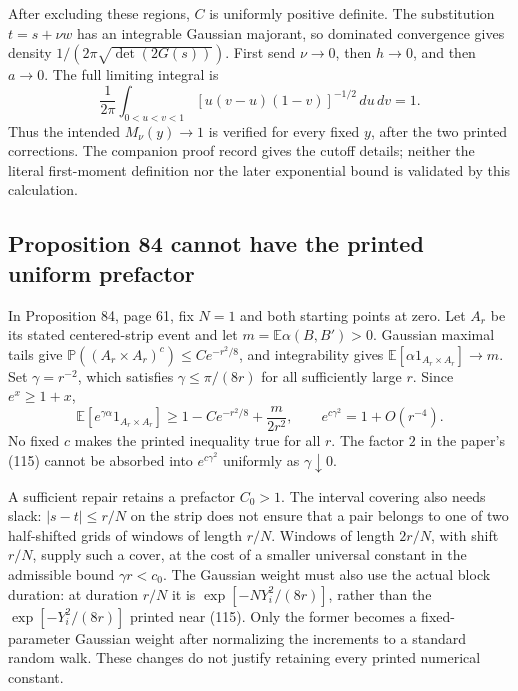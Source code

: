\documentclass[10pt]{article}
\begin{document}
After excluding these regions, \(C\) is uniformly positive definite. The substitution \(t=s+\nu w\) has an integrable Gaussian majorant, so dominated convergence gives density \(1/(2\pi\sqrt{\det(2G(s))})\). First send \(\nu\to0\), then \(h\to0\), and then \(a\to0\). The full limiting integral is \[\frac1{2\pi}\int_{0<u<v<1}
 [u(v-u)(1-v)]^{-1/2}\,du\,dv=1.\] Thus the intended \(M_\nu(y)\to1\) is verified for every fixed \(y\), after the two printed corrections. The companion proof record gives the cutoff details; neither the literal first-moment definition nor the later exponential bound is validated by this calculation.\par
\subsection*{Proposition 84 cannot have the printed uniform prefactor}
In Proposition 84, page 61, fix \(N=1\) and both starting points at zero. Let \(A_r\) be its stated centered-strip event and let \(m=\mathbb E\alpha(B,B')>0\). Gaussian maximal tails give \(\mathbb P((A_r\times A_r)^c)\le C e^{-r^2/8}\), and integrability gives \(\mathbb E[\alpha1_{A_r\times A_r}]\to m\). Set \(\gamma=r^{-2}\), which satisfies \(\gamma\le\pi/(8r)\) for all sufficiently large \(r\). Since \(e^x\ge1+x\), \[\mathbb E[e^{\gamma\alpha}1_{A_r\times A_r}]
 \ge1-Ce^{-r^2/8}+\frac{m}{2r^2},
 \qquad
 e^{c\gamma^2}=1+O(r^{-4}).\] No fixed \(c\) makes the printed inequality true for all \(r\). The factor \(2\) in the paper’s (115) cannot be absorbed into \(e^{c\gamma^2}\) uniformly as \(\gamma\downarrow0\).\par
A sufficient repair retains a prefactor \(C_0>1\). The interval covering also needs slack: \(|s-t|\le r/N\) on the strip does not ensure that a pair belongs to one of two half-shifted grids of windows of length \(r/N\). Windows of length \(2r/N\), with shift \(r/N\), supply such a cover, at the cost of a smaller universal constant in the admissible bound \(\gamma r<c_0\). The Gaussian weight must also use the actual block duration: at duration \(r/N\) it is \(\exp[-NY_i^2/(8r)]\), rather than the \(\exp[-Y_i^2/(8r)]\) printed near (115). Only the former becomes a fixed-parameter Gaussian weight after normalizing the increments to a standard random walk. These changes do not justify retaining every printed numerical constant.\par
\end{document}
